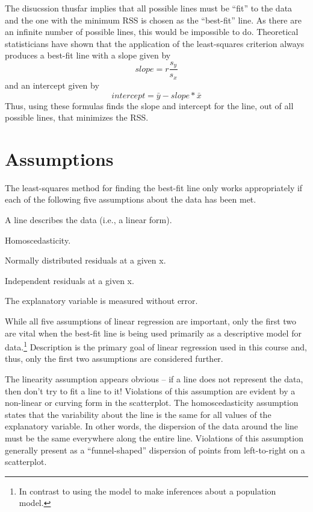 \documentclass[10pt,openany]{book}\usepackage[]{graphicx}\usepackage[]{color}
\begin{document}
\vspace{-12pt}

The disucssion thusfar implies that all possible lines must be ``fit'' to the data and the one with the minimum RSS is chosen as the ``best-fit'' line.  As there are an infinite number of possible lines, this would be impossible to do.  Theoretical statisticians have shown that the application of the least-squares criterion always produces a best-fit line with a slope given by
  \[ slope = r\frac{s_{y}}{s_{x}}  \]
and an intercept given by
  \[ intercept = \bar{y}-slope*\bar{x}   \]
Thus, using these formulas finds the slope and intercept for the line, out of all possible lines, that minimizes the RSS.


\section{Assumptions}\label{sect:RegAssumptions}
\vspace{-12pt}
The least-squares method for finding the best-fit line only works appropriately if each of the following five assumptions about the data has been met.

\vspace{-12pt}
\begin{Enumerate}
  \item A line describes the data (i.e., a linear form).
  \item Homoscedasticity.
  \item Normally distributed residuals at a given x.
  \item Independent residuals at a given x.
  \item The explanatory variable is measured without error.
\end{Enumerate}
\vspace{-6pt}

While all five assumptions of linear regression are important, only the first two are vital when the best-fit line is being used primarily as a descriptive model for data.\footnote{In contrast to using the model to make inferences about a population model.}  Description is the primary goal of linear regression used in this course and, thus, only the first two assumptions are considered further.

The linearity assumption appears obvious -- if a line does not represent the data, then don't try to fit a line to it!  Violations of this assumption are evident by a non-linear or curving form in the scatterplot.  The homoscedasticity assumption states that the variability about the line is the same for all values of the explanatory variable. In other words, the dispersion of the data around the line must be the same everywhere along the entire line.  Violations of this assumption generally present as a ``funnel-shaped'' dispersion of points from left-to-right on a scatterplot.
\end{document}
